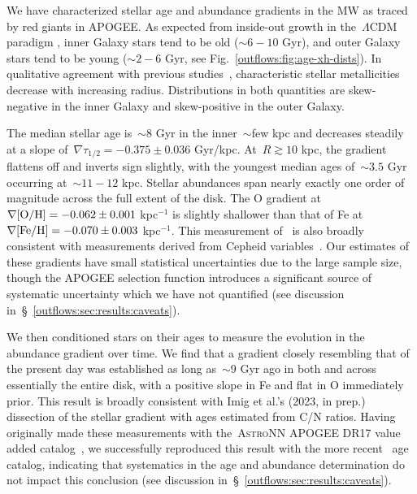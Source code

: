 We have characterized stellar age and abundance gradients in the MW as
traced by red giants in APOGEE.
As expected from inside-out growth in the~$\Lambda$CDM paradigm
\citep[e.g.,][]{White1991}, inner Galaxy stars tend to be old ($\sim$$6 - 10$
Gyr), and outer Galaxy stars tend to be young ($\sim$$2 - 6$ Gyr, see
Fig.~\ref{outflows:fig:age-xh-dists}).
In qualitative agreement with previous studies~\citep[e.g.,][]{Cheng2012,
Frinchaboy2013, Hayden2015, Myers2022}, characteristic stellar metallicities
decrease with increasing radius.
Distributions in both quantities are skew-negative in the inner Galaxy and
skew-positive in the outer Galaxy.
\par
The median stellar age is~$\sim$8 Gyr in the inner~$\sim$few kpc and decreases
steadily at a slope of~$\nabla\tau_{1/2} = -0.375 \pm 0.036$ Gyr/kpc.
At~$R \gtrsim 10$ kpc, the gradient flattens off and inverts sign slightly,
with the youngest median ages of~$\sim$$3.5$ Gyr occurring at~$\sim$$11 - 12$
kpc.
Stellar abundances span nearly exactly one order of magnitude across the full
extent of the disk.
The O gradient at~$\nabla\text{[O/H]} = -0.062 \pm 0.001$ kpc$^{-1}$ is slightly
shallower than that of Fe at~$\nabla\text{[Fe/H]} = -0.070 \pm 0.003$ kpc$^{-1}$.
This measurement of~ is also broadly consistent with measurements
derived from Cepheid variables~\citep{Luck2011a, Luck2011b, Genovali2014,
Lemasle2018}.
Our estimates of these gradients have small statistical uncertainties due to
the large sample size, though the APOGEE selection function introduces a
significant source of systematic uncertainty which we have not quantified
(see discussion in~\S~\ref{outflows:sec:results:caveats}).
\par
We then conditioned stars on their ages to measure the evolution in the
abundance gradient over time.
We find that a gradient closely resembling that of the present day was
established as long as~$\sim$9 Gyr ago in both \space \oh \space and \space \feh
\space across essentially the entire disk, with a positive slope in Fe and
flat in O immediately prior.
This result is broadly consistent with Imig et al.'s (2023, in prep.) dissection
of the stellar gradient with ages estimated from C/N ratios.
Having originally made these measurements with the~\textsc{AstroNN} APOGEE DR17
value added catalog~\citep{Mackereth2019b}, we successfully reproduced this
result with the more recent~\citet{Leung2023} age catalog, indicating that
systematics in the age and abundance determination do not impact this
conclusion (see discussion in~\S~\ref{outflows:sec:results:caveats}).
